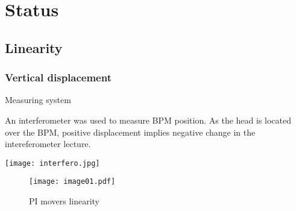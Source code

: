 \chapter{Status}
\section{Linearity}
\subsection{Vertical displacement}
Measuring system\par
An interferometer was used to measure BPM position. As the head is located over the BPM, positive displacement implies negative change in the intereferometer lecture.\par
\hspace*{1.4cm}\texttt{[image: interfero.jpg]}\par
\begin{figure}[htb]
\centering
 \texttt{[image: image01.pdf]}\caption{PI movers linearity}\label{f-LinPI01}
\end{figure}
